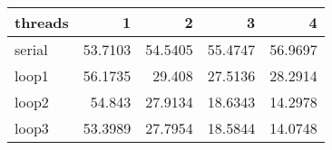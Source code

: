 \begin{tabular}{lrrrr}
\hline
 threads   &       1 &       2 &       3 &       4 \\
\hline
 serial    & 53.7103 & 54.5405 & 55.4747 & 56.9697 \\
 loop1     & 56.1735 & 29.408  & 27.5136 & 28.2914 \\
 loop2     & 54.843  & 27.9134 & 18.6343 & 14.2978 \\
 loop3     & 53.3989 & 27.7954 & 18.5844 & 14.0748 \\
\hline
\end{tabular}
